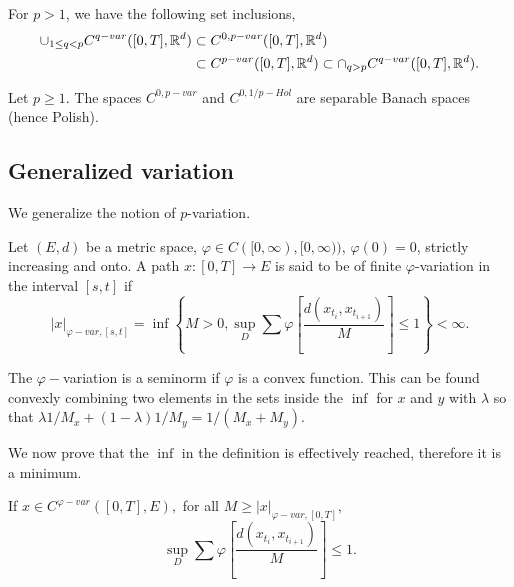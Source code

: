 \begin{corollary}
    For $p > 1$, we have the following set inclusions,
    \begin{align}
        \cup_{1 \le q < p} C^{q-var}([0,T], \mathbb{R}^d) &\subset C^{0,p-var}([0,T], \mathbb{R}^d) \\
        &\subset C^{p-var}([0,T], \mathbb{R}^d) \subset \cap_{q > p} C^{q-var}([0,T], \mathbb{R}^d).
    \end{align}
\end{corollary}

\begin{proposition}
    Let $p \ge 1$. The spaces $C^{0,p-var}$ and $C^{0,1/p-Hol}$ are separable Banach spaces (hence Polish).
\end{proposition}

\subsection{Generalized variation}

We generalize the notion of $p$-variation.

\begin{definition}
    Let $(E,d)$ be a metric space, $\varphi \in C([0,\infty),[0,\infty))$, $\varphi(0)=0$, strictly increasing and onto.
    A path $x:[0,T] \rightarrow E$ is said to be of finite $\varphi$-variation in the interval $[s,t]$ if
    \begin{equation}
        |x|_{\varphi-var,[s,t]} = \inf \left\{ M > 0, \sup_D \sum \varphi \left[ \frac{d(x_{t_i}, x_{t_{i+1}})}{M} \right] \leq 1 \right\} < \infty.
    \end{equation}
\end{definition}

\begin{observation}
    The $\varphi-$variation is a seminorm if $\varphi$ is a convex function. This can be found convexly combining two elements in the sets inside the $\inf$ for $x$ and $y$ with $\lambda$ so that $\lambda 1/M_x + (1 - \lambda) 1/M_y = 1 / (M_x + M_y).$
\end{observation}

We now prove that the $\inf$ in the definition is effectively reached, therefore it is a minimum.

\begin{lemma}
    If $x \in C^{\varphi-var}([0,T], E),$ for all $M \geq |x|_{\varphi-var,[0,T]},$ 
    \begin{equation}
         \sup_D \sum \varphi \left[ \frac{d(x_{t_i}, x_{t_{i+1}})}{M} \right] \leq 1.
    \end{equation}
\end{lemma}

